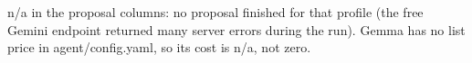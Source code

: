 {\footnotesize n/a in the proposal columns: no proposal finished for that profile (the free Gemini endpoint returned many server errors during the run). Gemma has no list price in agent/config.yaml, so its cost is n/a, not zero.}
